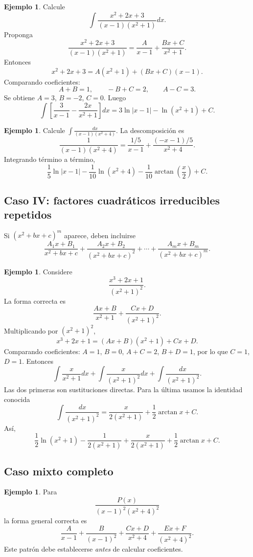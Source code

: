 \documentclass[12pt]{article}
\theoremstyle{definition}
\newtheorem{ejemplo}[teorema]{Ejemplo}
\theoremstyle{remark}
\begin{document}
\begin{ejemplo}Calcule
\[\int\frac{x^2+2x+3}{(x-1)(x^2+1)}dx.\]
Proponga
\[\frac{x^2+2x+3}{(x-1)(x^2+1)}=\frac{A}{x-1}+\frac{Bx+C}{x^2+1}.\]
Entonces
\[x^2+2x+3=A(x^2+1)+(Bx+C)(x-1).\]
Comparando coeficientes:
\[A+B=1,\qquad -B+C=2,\qquad A-C=3.\]
Se obtiene $A=3$, $B=-2$, $C=0$. Luego
\[\int\left[\frac3{x-1}-\frac{2x}{x^2+1}\right]dx
=\boxed{3\ln|x-1|-\ln(x^2+1)+C}.\]\end{ejemplo}

\begin{ejemplo}Calcule $\int\frac{dx}{(x-1)(x^2+4)}$. La descomposición es
\[\frac1{(x-1)(x^2+4)}=\frac{1/5}{x-1}+\frac{(-x-1)/5}{x^2+4}.\]
Integrando término a término,
\[\boxed{\frac15\ln|x-1|-\frac1{10}\ln(x^2+4)-\frac1{10}\arctan\left(\frac{x}{2}\right)+C}.\]\end{ejemplo}
\subsection*{Caso IV: factores cuadráticos irreducibles repetidos}
Si $(x^2+bx+c)^m$ aparece, deben incluirse
\[\frac{A_1x+B_1}{x^2+bx+c}+\frac{A_2x+B_2}{(x^2+bx+c)^2}+\cdots+\frac{A_mx+B_m}{(x^2+bx+c)^m}.\]

\begin{ejemplo}Considere
\[\frac{x^3+2x+1}{(x^2+1)^2}.\]
La forma correcta es
\[\frac{Ax+B}{x^2+1}+\frac{Cx+D}{(x^2+1)^2}.\]
Multiplicando por $(x^2+1)^2$,
\[x^3+2x+1=(Ax+B)(x^2+1)+Cx+D.\]
Comparando coeficientes: $A=1$, $B=0$, $A+C=2$, $B+D=1$, por lo que $C=1$, $D=1$. Entonces
\[\int\frac{x}{x^2+1}dx+\int\frac{x}{(x^2+1)^2}dx+\int\frac{dx}{(x^2+1)^2}.\]
Las dos primeras son sustituciones directas. Para la última usamos la identidad conocida
\[\int\frac{dx}{(x^2+1)^2}=\frac{x}{2(x^2+1)}+\frac12\arctan x+C.\]
Así,
\[\boxed{\frac12\ln(x^2+1)-\frac1{2(x^2+1)}+\frac{x}{2(x^2+1)}+\frac12\arctan x+C}.\]\end{ejemplo}
\subsection*{Caso mixto completo}
\begin{ejemplo}Para
\[\frac{P(x)}{(x-1)^2(x^2+4)^2}\]
la forma general correcta es
\[\frac{A}{x-1}+\frac{B}{(x-1)^2}+\frac{Cx+D}{x^2+4}+\frac{Ex+F}{(x^2+4)^2}.\]
Este patrón debe establecerse \emph{antes} de calcular coeficientes.\end{ejemplo}
\end{document}

